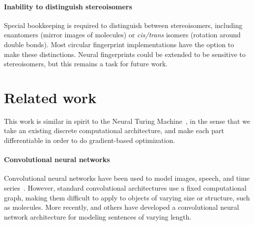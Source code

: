 \documentclass{article}
\begin{document}
\paragraph{Inability to distinguish stereoisomers}
Special bookkeeping is required to distinguish between stereoisomers, including enantomers (mirror images of molecules) or {\it cis/trans} isomers (rotation around double bonds).
Most circular fingerprint implementations have the option to make these distinctions.
Neural fingerprints could be extended to be sensitive to stereoisomers, but this remains a task for future work.






\section{Related work}
This work is similar in spirit to the Neural Turing Machine~\citep{graves2014neural}, in the sense that we take an existing discrete computational architecture, and make each part differentiable in order to do gradient-based optimization.

\paragraph{Convolutional neural networks}
Convolutional neural networks have been used to model images, speech, and time series~\citep{lecun1995convolutional}.
However, standard convolutional architectures use a fixed computational graph, making them difficult to apply to objects of varying size or structure, such as molecules.
More recently, \cite{KalchbrennerACL2014} and others have developed a convolutional neural network architecture for modeling sentences of varying length.
\end{document}
